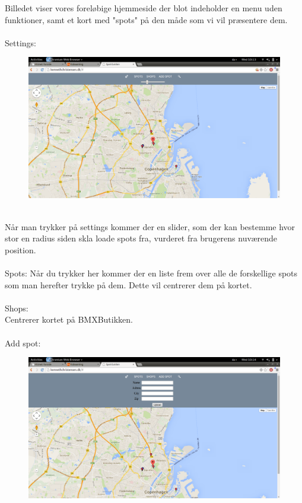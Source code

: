 \documentclass[12pt]{article}
\begin{document}
Billedet viser vores foreløbige hjemmeside der blot indeholder en menu uden funktioner, samt et kort med "spots" på den måde som vi vil præsentere dem. \\ \\
Settings: 
\begin{figure}[h]
\includegraphics[scale = 0.21]{slider}
\end{figure}\\
Når man trykker på settings kommer der en slider, som der kan bestemme hvor stor en radius siden skla loade spots fra, vurderet fra brugerens nuværende position.\\\\
Spots: 
Når du trykker her kommer der en liste frem over alle de forskellige spots som man herefter trykke på dem. Dette vil centrerer dem på kortet.\\\\
Shops: \\
Centrerer kortet på BMXButikken.\\ \\
Add spot:
\begin{figure}[h]
\includegraphics[scale = 0.21]{Addspot}
\end{figure}\\ 
\end{document}
